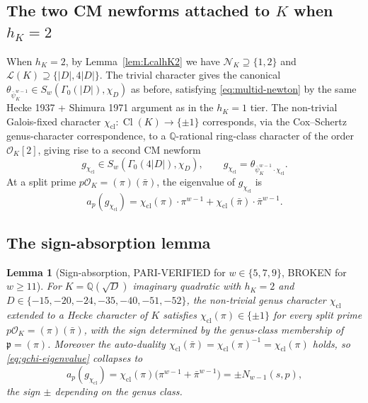 \documentclass[11pt,a4paper]{amsart}
\newtheorem{lemma}[theorem]{Lemma}
\theoremstyle{definition}
\DeclareMathOperator{\Cl}{Cl}
\newcommand{\Q}{\mathbb{Q}}
\newcommand{\OK}{\mathcal{O}_K}
\newcommand{\fp}{\mathfrak{p}}
\newcommand{\Lcal}{\mathcal{L}}
\newcommand{\Ncal}{\mathcal{N}}
\newcommand{\hK}{h_{K}}
\begin{document}
\subsection{The two CM newforms attached to $K$ when $h_K = 2$}\label{sec:thmB-two-forms}

When $\hK = 2$, by Lemma~\ref{lem:LcalhK2} we have $\Ncal_K \supseteq \{1, 2\}$ and $\Lcal(K) \supseteq \{|D|, 4|D|\}$. The trivial character gives the canonical $\theta_{\bar\psi_K^{w-1}} \in S_w(\Gamma_0(|D|), \chi_D)$ as before, satisfying \eqref{eq:multid-newton} by the same Hecke 1937 + Shimura 1971 argument as in the $\hK = 1$ tier. The non-trivial Galois-fixed character $\chi_{\mathrm{cl}} \colon \Cl(K) \to \{\pm 1\}$ corresponds, via the Cox--Schertz genus-character correspondence, to a $\Q$-rational ring-class character of the order $\OK[2]$, giving rise to a second CM newform
\begin{equation}\label{eq:second-form}
g_{\chi_{\mathrm{cl}}} \in S_w(\Gamma_0(4|D|), \chi_D), \qquad g_{\chi_{\mathrm{cl}}} = \theta_{\bar\psi_K^{w-1} \cdot \chi_{\mathrm{cl}}}.
\end{equation}
At a split prime $p\OK = (\pi)(\bar\pi)$, the eigenvalue of $g_{\chi_{\mathrm{cl}}}$ is
\begin{equation}\label{eq:gchi-eigenvalue}
a_p(g_{\chi_{\mathrm{cl}}}) = \chi_{\mathrm{cl}}(\pi) \cdot \pi^{w-1} + \chi_{\mathrm{cl}}(\bar\pi) \cdot \bar\pi^{w-1}.
\end{equation}

\subsection{The sign-absorption lemma}\label{sec:thmB-sign}

\begin{lemma}[Sign-absorption, PARI-VERIFIED for $w \in \{5,7,9\}$, BROKEN for $w \ge 11$]\label{lem:sign-absorption}
For $K = \Q(\sqrt{D})$ imaginary quadratic with $\hK = 2$ and $D \in \{-15, -20, -24, -35, -40, -51, -52\}$, the non-trivial genus character $\chi_{\mathrm{cl}}$ extended to a Hecke character of $K$ satisfies $\chi_{\mathrm{cl}}(\pi) \in \{\pm 1\}$ for every split prime $p\OK = (\pi)(\bar\pi)$, with the sign determined by the genus-class membership of $\fp = (\pi)$. Moreover the auto-duality $\chi_{\mathrm{cl}}(\bar\pi) = \chi_{\mathrm{cl}}(\pi)^{-1} = \chi_{\mathrm{cl}}(\pi)$ holds, so \eqref{eq:gchi-eigenvalue} collapses to
\[
a_p(g_{\chi_{\mathrm{cl}}}) = \chi_{\mathrm{cl}}(\pi) \bigl(\pi^{w-1} + \bar\pi^{w-1}\bigr) = \pm N_{w-1}(s, p),
\]
the sign $\pm$ depending on the genus class.
\end{lemma}
\end{document}
